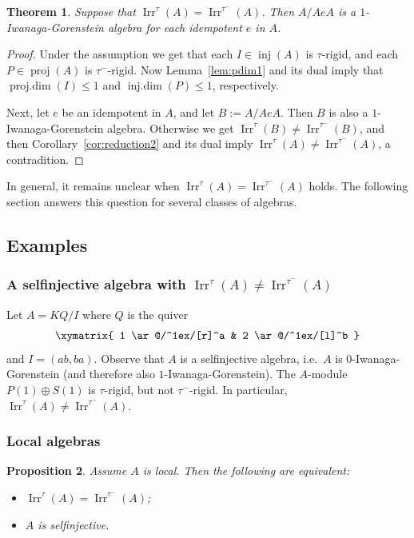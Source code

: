 \documentclass[12pt,reqno]{amsart}
\newtheorem{Thm}{Theorem}[section]
\newtheorem{Prop}[Thm]{Proposition}
\theoremstyle{definition}
\newcommand{\pdim}{\operatorname{proj.dim}}
\newcommand{\idim}{\operatorname{inj.dim}}
\newcommand{\proj}{\operatorname{proj}}
\newcommand{\inj}{\operatorname{inj}}
\newcommand{\irr}{\operatorname{Irr}}
\begin{document}
\begin{Thm}\label{thm:main4b}
Suppose that $\irr^\tau(A) = \irr^{\tau^-}(A)$.
Then $A/AeA$ is a $1$-Iwanaga-Gorenstein algebra for each
idempotent $e$ in $A$.
\end{Thm}

\begin{proof}
Under the assumption we get that
each $I \in \inj(A)$ is $\tau$-rigid, and each
$P \in \proj(A)$ is $\tau^-$-rigid.
Now Lemma~\ref{lem:pdim1} and its dual
imply that $\pdim(I) \le 1$ and $\idim(P) \le 1$, respectively.

Next, let $e$ be an idempotent in $A$, and let $B := A/AeA$.
Then $B$ is also a $1$-Iwanaga-Gorenstein algebra.
Otherwise
we get $\irr^\tau(B) \not= \irr^{\tau^-}(B)$, and then Corollary~\ref{cor:reduction2} and its dual imply
$\irr^\tau(A) \not= \irr^{\tau^-}(A)$, a contradition.
\end{proof}

In general,
it remains unclear when $\irr^\tau(A) = \irr^{\tau^-}(A)$ holds.
The following section
answers this question for several
classes of algebras.


\subsection{Examples}

\subsubsection{A selfinjective algebra with $\irr^\tau(A) \not= \irr^{\tau^-}(A)$}
Let $A = KQ/I$ where $Q$ is the quiver
$$
\xymatrix{
1 \ar@/^1ex/[r]^a & 2 \ar@/^1ex/[l]^b
}
$$
and $I = (ab,ba)$.
Observe that $A$ is a selfinjective algebra,
i.e.\ $A$ is $0$-Iwanaga-Gorenstein (and therefore also
$1$-Iwanaga-Gorenstein).
The $A$-module
$P(1) \oplus S(1)$
is $\tau$-rigid, but not $\tau^-$-rigid.
In particular, $\irr^\tau(A) \not= \irr^{\tau^-}(A)$.

\subsubsection{Local algebras}

\begin{Prop}
Assume $A$ is local.
Then the following are equivalent:
\begin{itemize}\itemsep2mm

\item[(i)]
$\irr^\tau(A) = \irr^{\tau^-}(A)$;

\item[(ii)]
$A$ is selfinjective.

\end{itemize}
\end{Prop}
\end{document}
